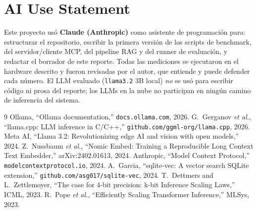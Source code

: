 \documentclass[conference]{IEEEtran}
\begin{document}
\section*{AI Use Statement}
Este proyecto usó \textbf{Claude (Anthropic)} como asistente de programación
para: estructurar el repositorio, escribir la primera versión de los scripts de
benchmark, del servidor/cliente MCP, del pipeline RAG y del runner de
evaluación, y redactar el borrador de este reporte. Todas las mediciones se
ejecutaron en el hardware descrito y fueron revisadas por el autor, que entiende
y puede defender cada número. El LLM evaluado (\texttt{llama3.2} 3B local)
\emph{no} se usó para escribir código ni prosa del reporte; los LLMs en la nube
no participan en ningún camino de inferencia del sistema.

\begin{thebibliography}{9}
 Ollama, ``Ollama documentation,'' \texttt{docs.ollama.com}, 2026.
 G.~Gerganov \emph{et al.}, ``llama.cpp: LLM inference in
C/C++,'' \texttt{github.com/ggml-org/llama.cpp}, 2026.
 Meta AI, ``Llama 3.2: Revolutionizing edge AI and vision with
open models,'' 2024.
 Z.~Nussbaum \emph{et al.}, ``Nomic Embed: Training a
Reproducible Long Context Text Embedder,'' arXiv:2402.01613, 2024.
 Anthropic, ``Model Context Protocol,''
\texttt{modelcontextprotocol.io}, 2024.
 A.~Garcia, ``sqlite-vec: A vector search SQLite extension,''
\texttt{github.com/asg017/sqlite-vec}, 2024.
 T.~Dettmers and L.~Zettlemoyer, ``The case for 4-bit
precision: k-bit Inference Scaling Laws,'' ICML, 2023.
 R.~Pope \emph{et al.}, ``Efficiently Scaling Transformer
Inference,'' MLSys, 2023.
\end{thebibliography}
\end{document}
